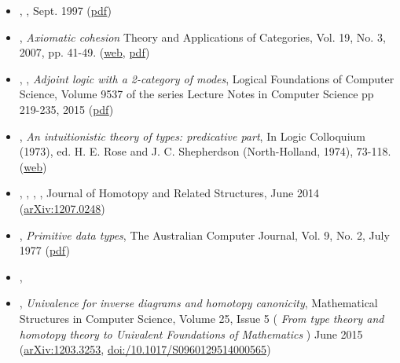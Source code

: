 \documentclass[12pt,titlepage]{article}
\theoremstyle{plain}
\theoremstyle{definition}
\theoremstyle{remark}
\begin{document}
\begin{itemize}
\item {}, \emph{}, Sept. 1997 (\href{http://www.acsu.buffalo.edu/~wlawvere/ToposMotion.pdf}{pdf})


\item {}, \emph{Axiomatic cohesion} Theory and Applications of Categories, Vol. 19, No. 3, 2007, pp. 41-49. (\href{http://www.tac.mta.ca/tac/volumes/19/3/19-03abs.html}{web}, \href{http://www.tac.mta.ca/tac/volumes/19/3/19-03.pdf}{pdf})


\item {}, , \emph{Adjoint logic with a 2-category of modes}, Logical Foundations of Computer Science, Volume 9537 of the series Lecture Notes in Computer Science pp 219-235, 2015 (\href{http://dlicata.web.wesleyan.edu/pubs/ls15adjoint/ls15adjoint.pdf}{pdf})


\item {}, \emph{An intuitionistic theory of types: predicative part}, In Logic Colloquium (1973), ed. H. E. Rose and J. C. Shepherdson (North-Holland, 1974), 73-118. (\href{http://citeseerx.ist.psu.edu/viewdoc/summary?doi=10.1.1.131.926}{web})


\item {}, , , \emph{}, Journal of Homotopy and Related Structures, June 2014 (\href{http://arxiv.org/abs/1207.0248}{arXiv:1207.0248})


\item {}, \emph{Primitive data types}, The Australian Computer Journal, Vol. 9, No. 2, July 1977 (\href{http://eprints.utas.edu.au/139/1/PrimitiveData.pdf}{pdf})


\item {}, \emph{}


\item {}, \emph{Univalence for inverse diagrams and homotopy canonicity}, Mathematical Structures in Computer Science, Volume 25, Issue 5 ( \emph{From type theory and homotopy theory to Univalent Foundations of Mathematics} ) June 2015 (\href{https://arxiv.org/abs/1203.3253}{arXiv:1203.3253}, \href{https://doi.org/10.1017/S0960129514000565}{doi:/10.1017/S0960129514000565})



\end{itemize}
\end{document}
